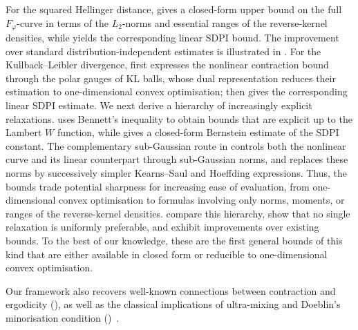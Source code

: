 \documentclass[11pt]{article}
\theoremstyle{plain}
\theoremstyle{remark}
\begin{document}
For the squared Hellinger distance,  gives a closed-form upper bound on the full $F_\varphi$-curve in terms of the $L_2$-norms and essential ranges of the reverse-kernel densities, while  yields the corresponding linear SDPI bound. The improvement over standard distribution-independent estimates is illustrated in . For the Kullback--Leibler divergence,  first expresses the nonlinear contraction bound through the polar gauges of KL balls, whose dual representation reduces their estimation to one-dimensional convex optimisation;  then gives the corresponding linear SDPI estimate. We next derive a hierarchy of increasingly explicit relaxations.  uses Bennett's inequality to obtain bounds that are explicit up to the Lambert $W$ function, while  gives a closed-form Bernstein estimate of the SDPI constant. The complementary sub-Gaussian route in  controls both the nonlinear curve and its linear counterpart through sub-Gaussian norms, and  replaces these norms by successively simpler Kearns--Saul and Hoeffding expressions. Thus, the bounds trade potential sharpness for increasing ease of evaluation, from one-dimensional convex optimisation to formulas involving only norms, moments, or ranges of the reverse-kernel densities.  compare this hierarchy, show that no single relaxation is uniformly preferable, and exhibit improvements over existing bounds. To the best of our knowledge, these are the first general bounds of this kind that are either available in closed form or reducible to one-dimensional convex optimisation.

Our framework also recovers well-known connections between contraction and ergodicity (), as well as the classical implications of ultra-mixing and Doeblin's minorisation condition ()~\cite{contractionLedoux,hiddenMarkovModels,sdpiRaginsky}.%
\end{document}
